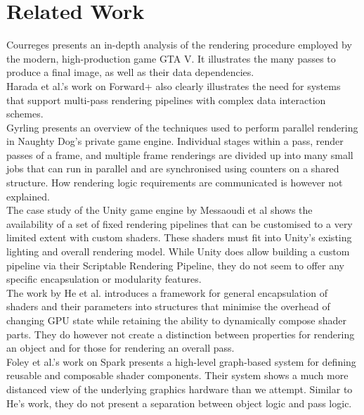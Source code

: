 \documentclass[format=sigconf]{acmart}
\begin{document}
\section{Related Work}\label{relatedwork}
Courreges\cite{gtav} presents an in-depth analysis of the rendering procedure employed by the modern, high-production game GTA V. It illustrates the many passes to produce a final image, as well as their data dependencies. \\

Harada et al.'s work on Forward+\cite{forward+}\cite{forward+talk} also clearly illustrates the need for systems that support multi-pass rendering pipelines with complex data interaction schemes. \\

Gyrling\cite{fibers} presents an overview of the techniques used to perform parallel rendering in Naughty Dog's private game engine. Individual stages within a pass, render passes of a frame, and multiple frame renderings are divided up into many small jobs that can run in parallel and are synchronised using counters on a shared structure. How rendering logic requirements are communicated is however not explained. \\

The case study of the Unity game engine by Messaoudi et al\cite{unity} shows the availability of a set of fixed rendering pipelines that can be customised to a very limited extent with custom shaders. These shaders must fit into Unity's existing lighting and overall rendering model. While Unity does allow building a custom pipeline via their Scriptable Rendering Pipeline\cite{unitycustom}, they do not seem to offer any specific encapsulation or modularity features. \\

The work by He et al.\cite{components} introduces a framework for general encapsulation of shaders and their parameters into structures that minimise the overhead of changing GPU state while retaining the ability to dynamically compose shader parts. They do however not create a distinction between properties for rendering an object and for those for rendering an overall pass. \\

Foley et al.'s work on Spark\cite{spark} presents a high-level graph-based system for defining reusable and composable shader components. Their system shows a much more distanced view of the underlying graphics hardware than we attempt. Similar to He's work, they do not present a separation between object logic and pass logic. \\
\end{document}
